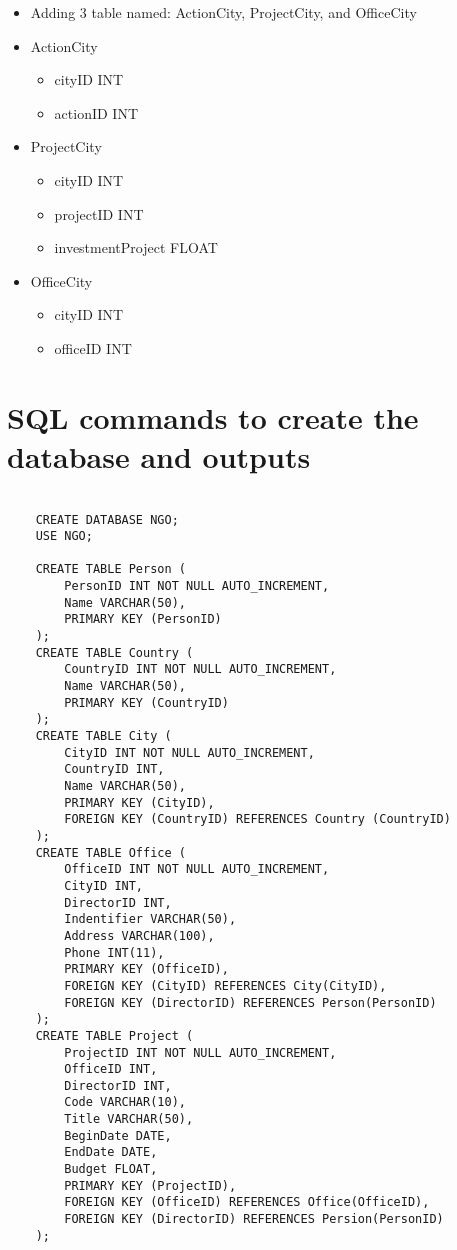 \documentclass[13pt,a4paper]{report}
\begin{document}
\begin{itemize}
\begin{itemize}
\begin{itemize}
		\end{itemize}
	\item Adding 3 table named: ActionCity, ProjectCity, and OfficeCity
	\item ActionCity
		\begin{itemize}
		\item cityID INT
		\item actionID INT
		\end{itemize}
	\item ProjectCity
		\begin{itemize}
		\item cityID INT
		\item projectID INT
		\item investmentProject FLOAT
		\end{itemize}
	\item OfficeCity
		\begin{itemize}
		\item cityID INT
		\item officeID INT
		\end{itemize}
	\end{itemize}
\section{ SQL commands to create the database and outputs}
\begin{lstlisting}
		
	CREATE DATABASE NGO;
	USE NGO;	

	CREATE TABLE Person ( 
		PersonID INT NOT NULL AUTO_INCREMENT, 
		Name VARCHAR(50), 
		PRIMARY KEY (PersonID)
	);
	CREATE TABLE Country ( 
		CountryID INT NOT NULL AUTO_INCREMENT, 
		Name VARCHAR(50), 
		PRIMARY KEY (CountryID)
	);
	CREATE TABLE City ( 
		CityID INT NOT NULL AUTO_INCREMENT, 
		CountryID INT,
		Name VARCHAR(50), 
		PRIMARY KEY (CityID),
		FOREIGN KEY (CountryID) REFERENCES Country (CountryID)
	);
	CREATE TABLE Office ( 
		OfficeID INT NOT NULL AUTO_INCREMENT, 
		CityID INT,
		DirectorID INT,
		Indentifier VARCHAR(50), 
		Address VARCHAR(100), 
		Phone INT(11),
		PRIMARY KEY (OfficeID),
		FOREIGN KEY (CityID) REFERENCES City(CityID),
		FOREIGN KEY (DirectorID) REFERENCES Person(PersonID)
	);
	CREATE TABLE Project ( 
		ProjectID INT NOT NULL AUTO_INCREMENT, 
		OfficeID INT,
		DirectorID INT,
		Code VARCHAR(10), 
		Title VARCHAR(50), 
		BeginDate DATE,
		EndDate DATE,
		Budget FLOAT,
		PRIMARY KEY (ProjectID),
		FOREIGN KEY (OfficeID) REFERENCES Office(OfficeID),
		FOREIGN KEY (DirectorID) REFERENCES Persion(PersonID)
	);
	

\end{lstlisting}
\end{itemize}
\end{document}

